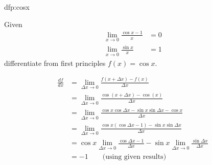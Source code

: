 \begin{defproblem}{dfp:cosx}%
 \begin{onlyproblem}%
 Given 
 \begin{align*}
 \lim_{x \rightarrow 0} \frac{\cos x - 1}{x} & = 0\\
 \lim_{x \rightarrow 0} \frac{\sin x}{x} & = 1
 \end{align*}
 differentiate from first principles $f(x) = \cos x$.%
 \end{onlyproblem}%
 \begin{onlysolution}%
 \begin{align*}
 \frac{df}{dx} & = \lim_{\Delta x \rightarrow 0}\frac{f(x + \Delta x) - f(x)}{\Delta x}\\
  & = \lim_{\Delta x \rightarrow 0} \frac{\cos(x + \Delta x) - \cos(x)}{\Delta x}\\
  & = \lim_{\Delta x \rightarrow 0} \frac{\cos x\cos\Delta x - \sin x\sin\Delta x - \cos x}{\Delta x}\\
  & = \lim_{\Delta x \rightarrow 0} \frac{\cos x(\cos\Delta x - 1) - \sin x\sin\Delta x}{\Delta x}\\
  & = \cos x\lim_{\Delta x \rightarrow 0}\frac{\cos\Delta x - 1}{\Delta x} 
       - \sin x\lim_{\Delta x \rightarrow 0}\frac{\sin\Delta x}{\Delta x}\\
  & = -1 \qquad\text{(using given results)}
 \end{align*}%
 \end{onlysolution}%
\end{defproblem}

